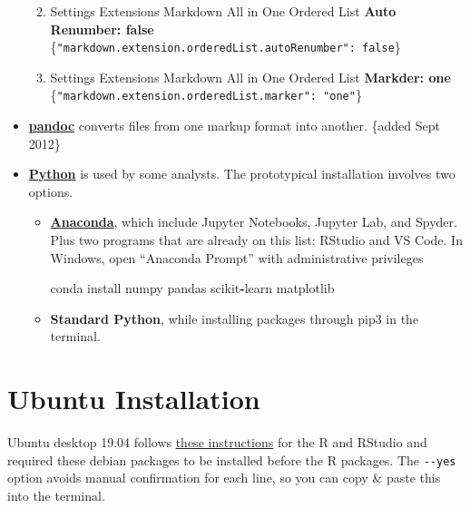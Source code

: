 \documentclass[
]{book}
\newenvironment{Shaded}{\begin{snugshade}}{\end{snugshade}}
\newcommand{\NormalTok}[1]{#1}
\newcommand{\OperatorTok}[1]{\textcolor[rgb]{0.81,0.36,0.00}{\textbf{#1}}}
\providecommand{\tightlist}{%
  \setlength{\itemsep}{0pt}\setlength{\parskip}{0pt}}
\begin{document}
\begin{itemize}
  \begin{enumerate}
  \def\labelenumi{\arabic{enumi}.}
  \tightlist
  \item
    Settings \textbar{} Extensions \textbar Markdown All in One \textbar{} Ordered List \textbar{} \textbf{Auto Renumber: false} \{\texttt{"markdown.extension.orderedList.autoRenumber":\ false}\}
  \item
    Settings \textbar{} Extensions \textbar Markdown All in One \textbar{} Ordered List \textbar{} \textbf{Markder: one} \{\texttt{"markdown.extension.orderedList.marker":\ "one"}\}
  \end{enumerate}
\item
  \textbf{\href{https://pandoc.org/}{pandoc}} converts files from one markup format into another. \{added Sept 2012\}
\item
  \textbf{\href{https://www.python.org/}{Python}} is used by some analysts. The prototypical installation involves two options.

  \begin{itemize}
  \item
    \textbf{\href{https://www.anaconda.com/distribution/\#download-section}{Anaconda}}, which include Jupyter Notebooks, Jupyter Lab, and Spyder. Plus two programs that are already on this list: RStudio and VS Code. In Windows, open ``Anaconda Prompt'' with administrative privileges

\begin{Shaded}
\begin{Highlighting}[]
\NormalTok{conda install numpy pandas scikit}\OperatorTok{{-}}\NormalTok{learn matplotlib}
\end{Highlighting}
\end{Shaded}
  \item
    \textbf{Standard Python}, while installing packages through pip3 in the terminal.
  \end{itemize}
\end{itemize}

\hypertarget{installation-ubuntu}{%
\section{Ubuntu Installation}\label{installation-ubuntu}}

Ubuntu desktop 19.04 follows \href{https://askubuntu.com/a/862520/153921}{these instructions} for the R and RStudio and required these debian packages to be installed before the R packages. The \texttt{-\/-yes} option avoids manual confirmation for each line, so you can copy \& paste this into the terminal.
\end{document}
